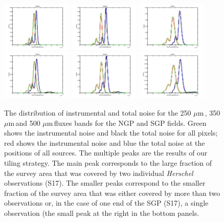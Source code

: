 \documentclass[useAMS,usenatbib]{mnras}
\def\mic{ $\mu $m\,}
\begin{document}
\begin{figure} %
\includegraphics[width=0.3\textwidth]{flux_noise_250NGP.pdf}
\includegraphics[width=0.3\textwidth]{flux_noise_350NGP.pdf}
\includegraphics[width=0.3\textwidth]{flux_noise_500NGP.pdf}
\includegraphics[width=0.3\textwidth]{flux_noise_250SGP.pdf}
\includegraphics[width=0.3\textwidth]{flux_noise_350SGP.pdf}
\includegraphics[width=0.3\textwidth]{flux_noise_500SGP.pdf}
\caption{The distribution of instrumental and total noise for the
  250\mic, 350\mic and 500\mic fluxes bands for the NGP and SGP
  fields.  Green shows the instrumental noise and black the total
  noise for all pixels; red shows the instrumental noise and blue the
  total noise at the positions of all sources.  The multiple peaks are
  the results of our tiling strategy. The main peak corresponds to the
  large fraction of the survey area that was covered by two individual
  {\it Herschel} observations (S17). The smaller peaks correspond to
  the smaller fraction of the survey area that was either covered by
  more than two observations or, in the case of one end of the SGP
  (S17), a single observation (the small peak at the right in the
  bottom panels.}
\label{fig_noise}
\end{figure}
\end{document}
